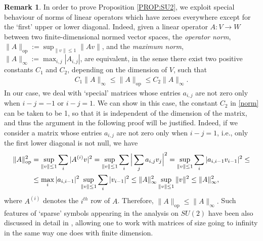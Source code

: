\documentclass[12pt,oneside,a4paper]{book}
\numberwithin{equation}{section}     %
\theoremstyle{plain}
\theoremstyle{definition}
\newtheorem{remark}[theorem]{Remark}
\DeclareMathOperator{\OP}{op}
\begin{document}
\begin{remark}\label{REM:matrices}
	In order to prove Proposition \ref{PROP:SU2}, we exploit special behaviour of norms of linear operators which have zeroes everywhere except for the `first' upper or lower diagonal. 
	Indeed, given a linear operator $A:V\rightarrow W$ between two finite-dimensional normed vector spaces, the \emph{operator norm}, $\|A\|_{\OP}:=\sup_{\|v\|\leq1}\|Av\|$, and the \emph{maximum norm}, $\|A\|_{\infty}:=\max_{i,j}|A_{i,j}|$, are equivalent, in the sense there exist two positive constants $C_1$ and $C_2$, {depending on the dimension of $V$}, such that
	\begin{align}\label{norm}
	C_1\|A\|_\infty\leq \|A\|_{\OP}\leq C_2 \|A\|_\infty.
	\end{align}
	In our case, we deal with `special' matrices whose entries $a_{i,j}$ are not zero only when $i-j=-1$ or $i-j=1$. We can show in this case, the constant $C_2$ in \eqref{norm} can be taken to be 1, so that it is independent of the dimension of the matrix, and thus  the argument in the following proof will be justified. Indeed, if we consider a matrix whose entries $a_{i,j}$ are not zero only when $i-j=1$, i.e., only the first lower diagonal is not null, we have
	\begin{align*}
	\|A\|^2_{\OP}&=\sup_{\|v\|\leq1}\sum_i |A^{(i)}v|^2=\sup_{\|v\|\leq1}\sum_i\Big{|}\sum_j a_{i,j}v_j\Big{|}^2=\sup_{\|v\|\leq1}\sum_i |a_{i,i-1}v_{i-1}|^2\leq\\
	&\leq \max_{i} |a_{i,i-1}|^2\sup_{\|v\|\leq1}\sum_i |v_{i-1}|^2\leq \|A\|^2_{\infty}\sup_{\|v\|\leq1}\|v\|^2\leq \|A\|^2_{\infty},
	\end{align*}
	where $A^{(i)}$ denotes the $i^{th}$ row of $A$.
	Therefore, $\|A\|_{\OP}\leq \|A\|_{\infty}.$ Such features of `sparse' symbols appearing in the analysis on $SU(2)$ have been also discussed in detail in \cite[Section 12.6]{RT2009}, allowing 
	one to work with matrices of size going to infinity in the same way one does with finite dimension.
\end{remark}
\end{document}
